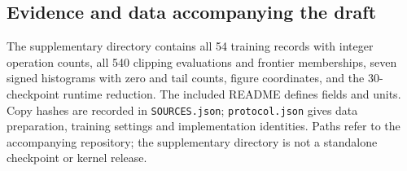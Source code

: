 \begin{table}[htbp]
\centering\small
\caption{Numerically qualified full-model speedups against native SDPA
CUDA graphs. GM is the equal-checkpoint geometric mean; the range is across
qualified checkpoints, not a confidence interval. All conditions use one
RTX5090, BF16, batch one, 2,048 tokens and full vocabulary logits. P0's
four-checkpoint subset is shown only to document its limited qualification.}
\label{tab:kernel-ablations}

\end{table}

\FloatBarrier
\subsection{Evidence and data accompanying the draft}
\label{app:result-data}

The supplementary directory  contains all 54 training records with
integer operation counts, all 540 clipping evaluations and frontier
memberships, seven signed histograms with zero and tail counts, figure
coordinates, and the 30-checkpoint runtime reduction. The included README
defines fields and units. Copy hashes are recorded in \texttt{SOURCES.json};
\texttt{protocol.json} gives data preparation, training settings and
implementation identities. Paths refer to the accompanying repository;
the supplementary directory is not a standalone checkpoint or kernel release.

